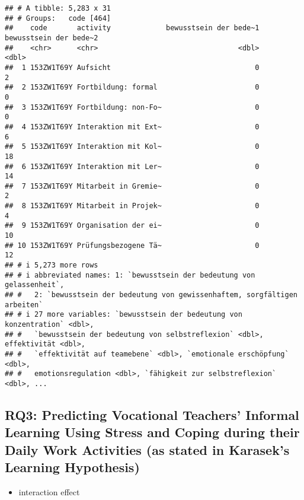 \documentclass[
]{article}
\providecommand{\tightlist}{%
  \setlength{\itemsep}{0pt}\setlength{\parskip}{0pt}}
\begin{document}
\begin{verbatim}
## # A tibble: 5,283 x 31
## # Groups:   code [464]
##    code       activity             bewusstsein der bede~1 bewusstsein der bede~2
##    <chr>      <chr>                                 <dbl>                  <dbl>
##  1 153ZW1T69Y Aufsicht                                  0                      2
##  2 153ZW1T69Y Fortbildung: formal                       0                      0
##  3 153ZW1T69Y Fortbildung: non-Fo~                      0                      0
##  4 153ZW1T69Y Interaktion mit Ext~                      0                      6
##  5 153ZW1T69Y Interaktion mit Kol~                      0                     18
##  6 153ZW1T69Y Interaktion mit Ler~                      0                     14
##  7 153ZW1T69Y Mitarbeit in Gremie~                      0                      2
##  8 153ZW1T69Y Mitarbeit in Projek~                      0                      4
##  9 153ZW1T69Y Organisation der ei~                      0                     10
## 10 153ZW1T69Y Prüfungsbezogene Tä~                      0                     12
## # i 5,273 more rows
## # i abbreviated names: 1: `bewusstsein der bedeutung von gelassenheit`,
## #   2: `bewusstsein der bedeutung von gewissenhaftem, sorgfältigen arbeiten`
## # i 27 more variables: `bewusstsein der bedeutung von konzentration` <dbl>,
## #   `bewusstsein der bedeutung von selbstreflexion` <dbl>, effektivität <dbl>,
## #   `effektivität auf teamebene` <dbl>, `emotionale erschöpfung` <dbl>,
## #   emotionsregulation <dbl>, `fähigkeit zur selbstreflexion` <dbl>, ...
\end{verbatim}

\subsection{RQ3: Predicting Vocational Teachers' Informal Learning Using
Stress and Coping during their Daily Work Activities (as stated in
Karasek's Learning
Hypothesis)}\label{rq3-predicting-vocational-teachers-informal-learning-using-stress-and-coping-during-their-daily-work-activities-as-stated-in-karaseks-learning-hypothesis}

\begin{itemize}
\tightlist
\item
  interaction effect
\end{itemize}
\end{document}
